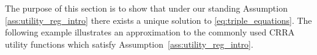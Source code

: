 \documentclass[11pt,oneside,english,reqno,dvipsnames,table]{amsart}
\numberwithin{equation}{section}
\theoremstyle{plain}
\theoremstyle{definition}
\theoremstyle{remark}
\newtheorem{rem}[thm]{\protect\remarkname}
\theoremstyle{plain}
\theoremstyle{plain}
\theoremstyle{plain}
\theoremstyle{plain}
\theoremstyle{plain}
\theoremstyle{plain}
\theoremstyle{plain}
\newtheorem{ass}[thm]{\protect\assumptionname}
\providecommand{\remarkname}{Remark}
\providecommand{\remarkname}{Remark}
\providecommand{\assumptionname}{Assumption}
\newcommand{\mbR}{\mathbb{R}}
\numberwithin{thm}{section}
\begin{document}
The purpose of this section is to show that under our standing Assumption \ref{ass:utility_reg_intro} there exists a unique solution to \eqref{eq:triple_equations}.
%
%
%
%
%
The following example illustrates an approximation to the commonly used CRRA utility functions which satisfy Assumption~\ref{ass:utility_reg_intro}.
%
\end{document}

